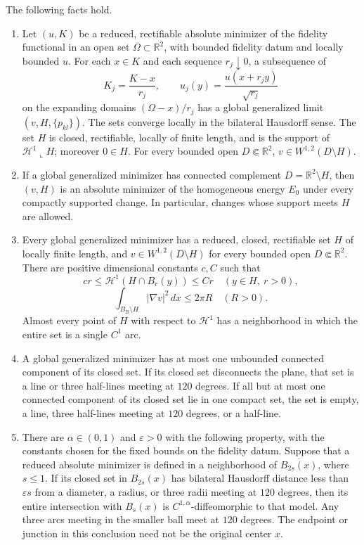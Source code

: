 \pagebreak[3]
\begin{proposition}
\label{prop:planar-facts}
The following facts hold.
\begin{enumerate}
\item\label{item:blowup}
Let $(u,K)$ be a reduced, rectifiable absolute minimizer of the fidelity
functional in an open set $\Omega\subset\mathbb R^2$, with bounded fidelity datum and locally
bounded $u$.  For each $x\in K$ and each sequence $r_j\downarrow0$, a subsequence
of
\[
 K_j=\frac{K-x}{r_j},\qquad
 u_j(y)=\frac{u(x+r_jy)}{\sqrt{r_j}}
\]
on the expanding domains $(\Omega-x)/r_j$ has a global generalized limit
$(v,H,\{p_{kl}\})$.  The sets converge locally in
the bilateral Hausdorff sense.  The set $H$ is closed, rectifiable, locally of
finite length, and is the support of $\mathcal H^1\!\llcorner H$; moreover
$0\in H$.  For every bounded open $D\Subset\mathbb R^2$,
$v\in W^{1,2}(D\setminus H)$.

\item\label{item:connected-absolute}
If a global generalized minimizer has connected complement
$D=\mathbb R^2\setminus H$, then $(v,H)$ is an absolute minimizer of the
homogeneous energy $E_0$ under every compactly supported change.  In particular, changes whose support
meets $H$ are allowed.

\item\label{item:global-estimates}
Every global generalized minimizer has a reduced, closed, rectifiable set
$H$ of locally finite length, and $v\in W^{1,2}(D\setminus H)$ for every
bounded open $D\Subset\mathbb R^2$.  There are positive dimensional constants
$c,C$ such that
\[
 c r\leq\mathcal H^1(H\cap B_r(y))\leq C r
 \quad(y\in H,\ r>0),
\]
\[
 \int_{B_R\setminus H}|\nabla v|^2\,dx\leq 2\pi R
 \quad(R>0).
\]
Almost every point of $H$ with respect to $\mathcal H^1$ has a neighborhood in
which the entire set is a single $C^1$ arc.

\item\label{item:classification}
A global generalized minimizer has at most one unbounded connected component
of its closed set.  If its closed set disconnects the plane, that set is a
line or three half-lines meeting at $120$ degrees.  If all but at most one
connected component of its closed set lie in one compact set, the set is empty,
a line, three half-lines meeting at $120$ degrees, or a half-line.

\item\label{item:epsilon}
There are $\alpha\in(0,1)$ and $\varepsilon>0$ with the following property, with the constants
chosen for the fixed bounds on the fidelity datum.  Suppose that a reduced
absolute minimizer is defined in a neighborhood of $\overline{B_{2s}(x)}$,
where $s\leq1$.  If its closed set in $B_{2s}(x)$ has bilateral Hausdorff
distance less than $\varepsilon s$ from a diameter, a radius, or three radii
meeting at $120$ degrees, then its entire intersection with $B_s(x)$ is
$C^{1,\alpha}$-diffeomorphic to that model.  Any three arcs meeting in the
smaller ball meet at $120$ degrees.  The endpoint or junction in this conclusion
need not be the original center $x$.
\end{enumerate}
\end{proposition}

